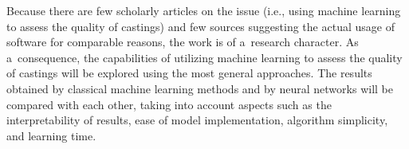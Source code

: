 Because there are few scholarly articles on the issue (i.e., using machine learning to assess the quality of castings) and few sources suggesting the actual usage of software for comparable reasons, the work is of a~research character. As a~consequence, the capabilities of utilizing machine learning to assess the quality of castings will be explored using the most general approaches. The results obtained by classical machine learning methods and by neural networks will be compared with each other, taking into account aspects such as the interpretability of results, ease of model implementation, algorithm simplicity, and learning time. 















